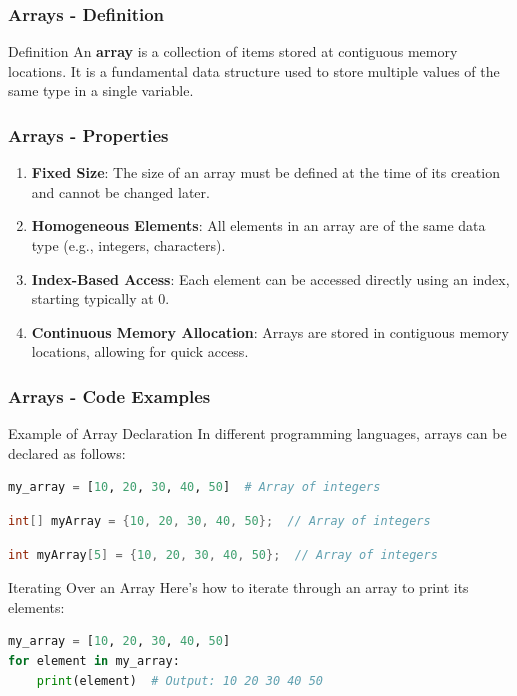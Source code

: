\documentclass{beamer}
\begin{document}
\begin{frame}[fragile]
    \frametitle{Arrays - Definition}
    \begin{block}{Definition}
        An \textbf{array} is a collection of items stored at contiguous memory locations. 
        It is a fundamental data structure used to store multiple values of the same type in a single variable.
    \end{block}
\end{frame}

\begin{frame}[fragile]
    \frametitle{Arrays - Properties}
    \begin{enumerate}
        \item \textbf{Fixed Size}: The size of an array must be defined at the time of its creation and cannot be changed later.
        \item \textbf{Homogeneous Elements}: All elements in an array are of the same data type (e.g., integers, characters).
        \item \textbf{Index-Based Access}: Each element can be accessed directly using an index, starting typically at 0.
        \item \textbf{Continuous Memory Allocation}: Arrays are stored in contiguous memory locations, allowing for quick access.
    \end{enumerate}
\end{frame}

\begin{frame}[fragile]
    \frametitle{Arrays - Code Examples}
    \begin{block}{Example of Array Declaration}
        In different programming languages, arrays can be declared as follows:
        \begin{lstlisting}[language=Python]
my_array = [10, 20, 30, 40, 50]  # Array of integers
        \end{lstlisting}
        \begin{lstlisting}[language=Java]
int[] myArray = {10, 20, 30, 40, 50};  // Array of integers
        \end{lstlisting}
        \begin{lstlisting}[language=C++]
int myArray[5] = {10, 20, 30, 40, 50};  // Array of integers
        \end{lstlisting}
    \end{block}
    
    \begin{block}{Iterating Over an Array}
        Here’s how to iterate through an array to print its elements:
        \begin{lstlisting}[language=Python]
my_array = [10, 20, 30, 40, 50]
for element in my_array:
    print(element)  # Output: 10 20 30 40 50
        \end{lstlisting}
    \end{block}
\end{frame}
\end{document}
